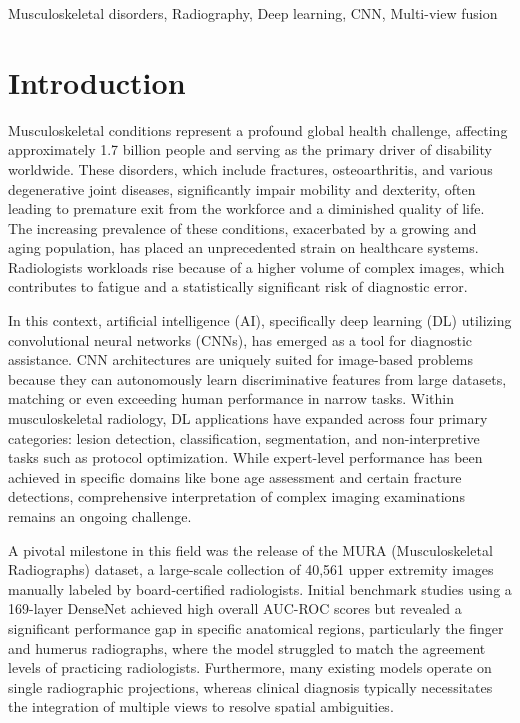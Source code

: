 \documentclass[conference]{IEEEtran}
\begin{document}
\begin{IEEEkeywords}
Musculoskeletal disorders, Radiography, Deep learning, CNN, Multi-view fusion
\end{IEEEkeywords}

\section{Introduction}
Musculoskeletal conditions represent a profound global health challenge, affecting approximately 1.7 billion people and serving as the primary driver of disability worldwide\cite{rajpurkar_mura_2018}. These disorders, which include fractures, osteoarthritis, and various degenerative joint diseases, significantly impair mobility and dexterity, often leading to premature exit from the workforce and a diminished quality of life. The increasing prevalence of these conditions, exacerbated by a growing and aging population, has placed an unprecedented strain on healthcare systems\cite{chada_machine_2019}. Radiologists  workloads rise because of a higher volume of complex images, which contributes to fatigue and a statistically significant risk of diagnostic error\cite{rajpurkar_mura_2018,chea_current_2020,singh_hybrid_2022}.

In this context, artificial intelligence (AI), specifically deep learning (DL) utilizing convolutional neural networks (CNNs), has emerged as a tool for diagnostic assistance\cite{chada_machine_2019,chea_current_2020,dangelo_artificial_2022}. CNN architectures are uniquely suited for image-based problems because they can autonomously learn discriminative features from large datasets, matching or even exceeding human performance in narrow tasks\cite{chea_current_2020,singh_hybrid_2022}. Within musculoskeletal radiology, DL applications have expanded across four primary categories: lesion detection, classification, segmentation, and non-interpretive tasks such as protocol optimization. While expert-level performance has been achieved in specific domains like bone age assessment and certain fracture detections, comprehensive interpretation of complex imaging examinations remains an ongoing challenge\cite{chea_current_2020,dangelo_artificial_2022}.

A pivotal milestone in this field was the release of the MURA (Musculoskeletal Radiographs) dataset, a large-scale collection of 40,561 upper extremity images manually labeled by board-certified radiologists\cite{rajpurkar_mura_2018}. Initial benchmark studies using a 169-layer DenseNet achieved high overall AUC-ROC scores but revealed a significant performance gap in specific anatomical regions, particularly the finger and humerus radiographs, where the model struggled to match the agreement levels of practicing radiologists. Furthermore, many existing models operate on single radiographic projections, whereas clinical diagnosis typically necessitates the integration of multiple views to resolve spatial ambiguities\cite{rajpurkar_mura_2018,dangelo_artificial_2022}.
\end{document}

